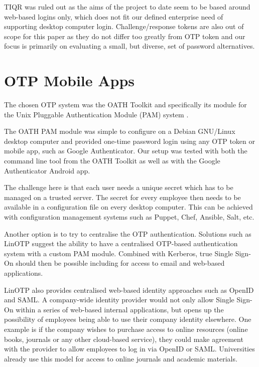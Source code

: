 \documentclass{report}
\begin{document}
TIQR was ruled out as the aims of the project to date seem to be based around
web-based logins only, which does not fit our defined enterprise need of
supporting desktop computer login. Challenge/response tokens are also
out of scope for this paper as they do not differ too greatly from OTP
token and our focus is primarily on evaluating a small, but diverse, set
of password alternatives.

\section{OTP Mobile Apps}
\label{sec:otp}

The chosen OTP system was the OATH Toolkit and specifically its
module for the Unix Pluggable Authentication Module (PAM) system
\parencite{samar1996unified}.

The OATH PAM module was simple to configure on a Debian GNU/Linux desktop
computer and provided one-time password login using any OTP token or mobile
app, such as Google Authenticator. Our setup was tested with both the
command line tool from the OATH Toolkit as well as with the
Google Authenticator Android app.

The challenge here is that each user needs a unique secret which has to
be managed on a trusted server. The secret for every employee then needs
to be available in a configuration file on every desktop computer. This
can be achieved with configuration management systems such as Puppet,
Chef, Ansible, Salt, etc.

Another option is to try to centralise the OTP authentication.
Solutions such as LinOTP suggest the ability to have a centralised
OTP-based authentication system with a custom PAM module. Combined
with Kerberos, true Single Sign-On should then be possible
including for access to email and web-based applications.

LinOTP also provides centralised web-based identity approaches
such as OpenID and SAML. A company-wide identity provider would
not only allow Single Sign-On within a series of web-based
internal applications, but opens up the possibility of employees
being able to use their company identity elsewhere. One example
is if the company wishes to purchase access to online resources
(online books, journals or any other cloud-based service), they
could make agreement with the provider to allow employees to log in
via OpenID or SAML. Universities already use this model for access to online
journals and academic materials.
\end{document}
